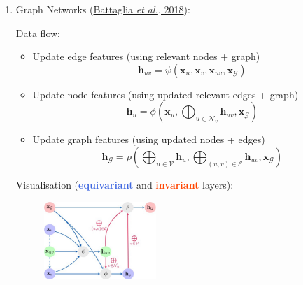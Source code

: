 \documentclass{article}
\begin{document}
\begin{enumerate}
	\item Graph Networks (\href{https://arxiv.org/pdf/1806.01261.pdf}{Battaglia \textit{et al.}, 2018}):
	
	Data flow:
	\begin{itemize}[topsep=0pt]
		\item Update edge features (using relevant nodes + graph)
		$$\mathbf{h}_{uv}=\psi(\mathbf{x}_u,\mathbf{x}_v,\mathbf{x}_{uv},\mathbf{x}_\mathcal{G})$$
		\item Update node features (using updated relevant edges + graph)
		$$\mathbf{h}_{u}=\phi\left(\mathbf{x}_u,\bigoplus_{u\in\mathcal{N}_v}\mathbf{h}_{uv},\mathbf{x}_\mathcal{G}\right)$$
		\item Update graph features (using updated nodes + edges)
		$$\mathbf{h}_\mathcal{G}=\rho\left(\bigoplus_{u\in\mathcal{V}}\mathbf{h}_{u},\bigoplus_{(u,v)\in\mathcal{E}}\mathbf{h}_{uv},\mathbf{x}_\mathcal{G}\right)$$
	\end{itemize}
	Visualisation (\textcolor{RoyalBlue}{\bf equivariant} and \textcolor{OrangeRed}{\bf invariant} layers):
	\begin{figure}[h]
		\centering
		\hspace*{4em}\includegraphics[width=0.4\textwidth]{figs/graph-network}
	\end{figure}


\end{enumerate}
\end{document}
